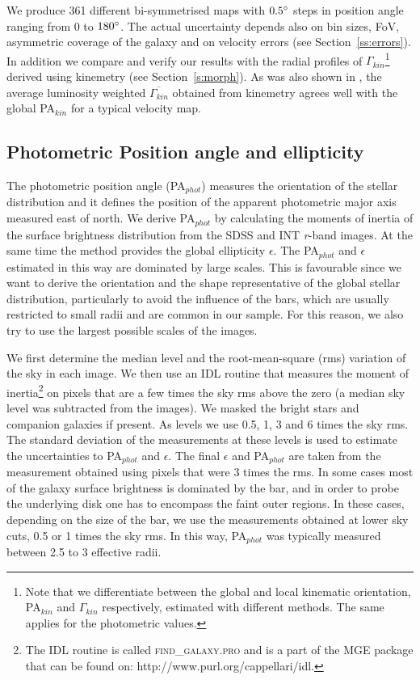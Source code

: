 \documentclass[usenatbib,usegraphicx]{mn2e}
\begin{document}
We produce 361 different bi-symmetrised maps with $0.5\hbox{$^\circ$}$ steps in position angle ranging from 0 to $180\hbox{$^\circ$}$. The actual uncertainty depends also on bin sizes, FoV, asymmetric coverage of the galaxy and on velocity errors (see Section~\ref{ss:errors}). In addition we compare and verify our results with the radial profiles of $\Gamma_{kin}$\footnote{Note that we differentiate between the global and local kinematic orientation, PA$_{kin}$ and $\Gamma_{kin}$ respectively, estimated with different methods. The same applies for the photometric values.} derived using kinemetry (see Section~\ref{s:morph}).  As was also shown in \citet{2006MNRAS.366..787K}, the average luminosity weighted $\overline{\Gamma_{kin}}$ obtained from kinemetry agrees well with the global PA$_{kin}$ for a typical velocity map.



\subsection{Photometric Position angle and ellipticity}
\label{ss:photPA}

The photometric position angle (PA$_{phot}$) measures the orientation of the stellar distribution and it defines the position of the apparent photometric major axis measured east of north. We derive PA$_{phot}$ by calculating the moments of inertia of the surface brightness distribution from the SDSS and INT {\it r}-band images. At the same time the method provides the global ellipticity $\epsilon$. The PA$_{phot}$  and $\epsilon$ estimated in this way are dominated by large scales. This is favourable since we want to derive the orientation and the shape representative of the global stellar distribution, particularly to avoid the influence of the bars, which are usually restricted to small radii and are common in our sample. For this reason, we also try to use the largest possible scales of the images.

We first determine the median level and the root-mean-square (rms) variation of the sky in each image. We then use an IDL routine that measures the moment of inertia\footnote{The IDL routine is called \textsc{find\_galaxy.pro} and is a part of the MGE package \citep{2002MNRAS.333..400C} that can be found on: http://www.purl.org/cappellari/idl.} on pixels that are a few times the sky rms above the zero (a median sky level was subtracted from the images). We masked the bright stars and companion galaxies if present. As levels we use 0.5, 1, 3 and 6 times the sky rms. The standard deviation of the measurements at these levels is used to estimate the uncertainties to PA$_{phot}$ and $\epsilon$. The final $\epsilon$ and PA$_{phot}$ are taken from the measurement obtained using pixels that were 3 times the rms. In some cases most of the galaxy surface brightness is dominated by the bar, and in order to probe the underlying disk one has to encompass the faint outer regions. In these cases, depending on the size of the bar, we use the measurements obtained at lower sky cuts, 0.5 or 1 times the sky rms. In this way, PA$_{phot}$ was typically measured between 2.5 to 3 effective radii. 
\end{document}
